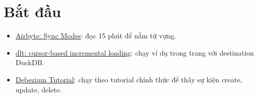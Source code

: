\section{Bắt đầu}
\begin{itemize}
  \item \href{https://docs.airbyte.com/platform/using-airbyte/core-concepts/sync-modes}{Airbyte: Sync Modes}: đọc 15 phút để nắm từ vựng.
  \item \href{https://dlthub.com/docs/general-usage/incremental/cursor}{dlt: cursor-based incremental loading}: chạy ví dụ trong trang với destination DuckDB.
  \item \href{https://debezium.io/documentation/reference/stable/tutorial.html}{Debezium Tutorial}: chạy theo tutorial chính thức để thấy sự kiện create, update, delete.
\end{itemize}

